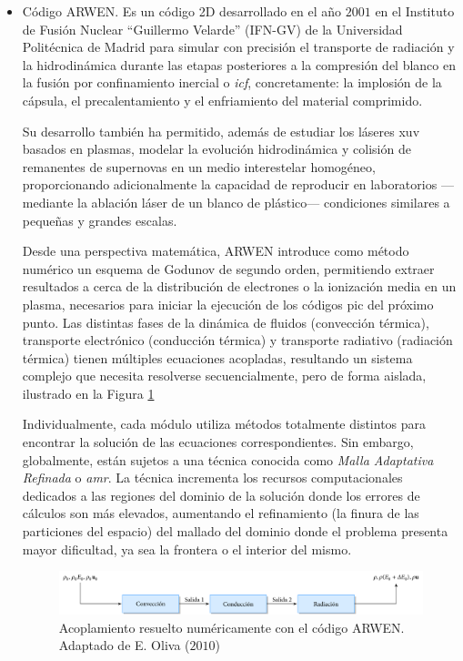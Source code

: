 \begin{itemize}

    \item Código ARWEN. Es un código 2D desarrollado en el año $2001$ en el Instituto de Fusión Nuclear \enquote{Guillermo Velarde} (IFN-GV) de la Universidad Politécnica de Madrid\autocite{Ogando2001} para simular con precisión el transporte de radiación y la hidrodinámica durante las etapas posteriores a la compresión del blanco en la fusión por confinamiento inercial\autocite{Velarde2005} o \emph{\acrfull{icf}}, concretamente: la implosión de la cápsula, el precalentamiento y el enfriamiento del material comprimido.

      Su desarrollo también ha permitido, además de estudiar los láseres \acrshort{xuv} basados en plasmas\autocite{Oliva2009,Oliva2010}, modelar la evolución hidrodinámica y colisión de remanentes de supernovas en un medio interestelar homogéneo\autocite{Velarde2006}, proporcionando adicionalmente la capacidad de reproducir en laboratorios ---mediante la ablación láser de un blanco de plástico--- condiciones similares a pequeñas y grandes escalas. 

      Desde una perspectiva matemática, ARWEN introduce como método numérico un esquema de Godunov de segundo orden, permitiendo extraer resultados a cerca de la distribución de electrones o la ionización media en un plasma, necesarios para iniciar la ejecución de los códigos \acrfull{pic} del próximo punto. Las distintas fases de la dinámica de fluidos (convección térmica), transporte electrónico (conducción térmica) y transporte radiativo (radiación térmica) tienen múltiples ecuaciones acopladas, resultando un sistema complejo que necesita resolverse secuencialmente, pero de forma aislada, ilustrado en la Figura \ref{fig:3.3}

      Individualmente, cada módulo utiliza métodos totalmente distintos para encontrar la solución de las ecuaciones correspondientes. Sin embargo, globalmente, están sujetos a una técnica conocida como \emph{Malla Adaptativa Refinada} o \emph{\acrfull{amr}}\autocite{Berger1989,Rendleman2000}. La técnica incrementa los recursos computacionales dedicados a las regiones del dominio de la solución donde los errores de cálculos son más elevados, aumentando el refinamiento (la finura de las particiones del espacio) del mallado del dominio donde el problema presenta mayor dificultad, ya sea la frontera o el interior del mismo.

      \begin{figure}
        \centering
        \includegraphics[width=\textwidth]{Figuras/ch3_arwen.pdf}
        \caption{Acoplamiento resuelto numéricamente con el código ARWEN. Adaptado de E. Oliva ($2010$) \autocite{Oliva2010a}}
        \label{fig:3.3}
      \end{figure}


\end{itemize}

